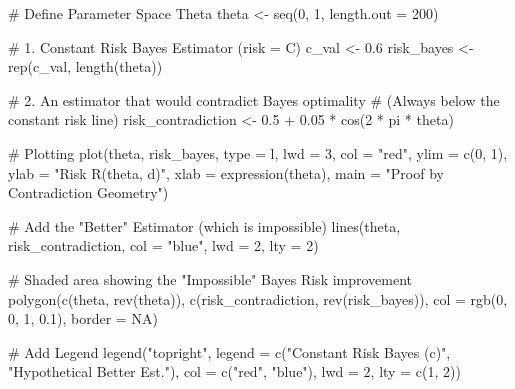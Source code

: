 \documentclass[
  letterpaper,
  DIV=11,
  numbers=noendperiod]{scrreprt}
\newenvironment{Shaded}{\begin{snugshade}}{\end{snugshade}}
\newcommand{\AttributeTok}[1]{\textcolor[rgb]{0.40,0.45,0.13}{#1}}
\newcommand{\CommentTok}[1]{\textcolor[rgb]{0.37,0.37,0.37}{#1}}
\newcommand{\ConstantTok}[1]{\textcolor[rgb]{0.56,0.35,0.01}{#1}}
\newcommand{\DecValTok}[1]{\textcolor[rgb]{0.68,0.00,0.00}{#1}}
\newcommand{\FloatTok}[1]{\textcolor[rgb]{0.68,0.00,0.00}{#1}}
\newcommand{\FunctionTok}[1]{\textcolor[rgb]{0.28,0.35,0.67}{#1}}
\newcommand{\NormalTok}[1]{\textcolor[rgb]{0.00,0.23,0.31}{#1}}
\newcommand{\OtherTok}[1]{\textcolor[rgb]{0.00,0.23,0.31}{#1}}
\newcommand{\SpecialCharTok}[1]{\textcolor[rgb]{0.37,0.37,0.37}{#1}}
\newcommand{\StringTok}[1]{\textcolor[rgb]{0.13,0.47,0.30}{#1}}
\renewcommand{\[}{\begin{equation}}
\renewcommand{\]}{\end{equation}}
\theoremstyle{definition}
\theoremstyle{plain}
\theoremstyle{plain}
\theoremstyle{plain}
\theoremstyle{definition}
\theoremstyle{plain}
\theoremstyle{remark}
\begin{document}
\begin{Shaded}
\begin{Highlighting}[]
\CommentTok{\# Define Parameter Space Theta}
\NormalTok{theta }\OtherTok{\textless{}{-}} \FunctionTok{seq}\NormalTok{(}\DecValTok{0}\NormalTok{, }\DecValTok{1}\NormalTok{, }\AttributeTok{length.out =} \DecValTok{200}\NormalTok{)}

\CommentTok{\# 1. Constant Risk Bayes Estimator (risk = C)}
\NormalTok{c\_val }\OtherTok{\textless{}{-}} \FloatTok{0.6}
\NormalTok{risk\_bayes }\OtherTok{\textless{}{-}} \FunctionTok{rep}\NormalTok{(c\_val, }\FunctionTok{length}\NormalTok{(theta))}

\CommentTok{\# 2. An estimator that would contradict Bayes optimality }
\CommentTok{\# (Always below the constant risk line)}
\NormalTok{risk\_contradiction }\OtherTok{\textless{}{-}} \FloatTok{0.5} \SpecialCharTok{+} \FloatTok{0.05} \SpecialCharTok{*} \FunctionTok{cos}\NormalTok{(}\DecValTok{2} \SpecialCharTok{*}\NormalTok{ pi }\SpecialCharTok{*}\NormalTok{ theta)}

\CommentTok{\# Plotting}
\FunctionTok{plot}\NormalTok{(theta, risk\_bayes, }\AttributeTok{type =} \StringTok{\textquotesingle{}l\textquotesingle{}}\NormalTok{, }\AttributeTok{lwd =} \DecValTok{3}\NormalTok{, }\AttributeTok{col =} \StringTok{"red"}\NormalTok{,}
     \AttributeTok{ylim =} \FunctionTok{c}\NormalTok{(}\DecValTok{0}\NormalTok{, }\DecValTok{1}\NormalTok{), }\AttributeTok{ylab =} \StringTok{"Risk R(theta, d)"}\NormalTok{, }\AttributeTok{xlab =} \FunctionTok{expression}\NormalTok{(theta),}
     \AttributeTok{main =} \StringTok{"Proof by Contradiction Geometry"}\NormalTok{)}

\CommentTok{\# Add the "Better" Estimator (which is impossible)}
\FunctionTok{lines}\NormalTok{(theta, risk\_contradiction, }\AttributeTok{col =} \StringTok{"blue"}\NormalTok{, }\AttributeTok{lwd =} \DecValTok{2}\NormalTok{, }\AttributeTok{lty =} \DecValTok{2}\NormalTok{)}

\CommentTok{\# Shaded area showing the "Impossible" Bayes Risk improvement}
\FunctionTok{polygon}\NormalTok{(}\FunctionTok{c}\NormalTok{(theta, }\FunctionTok{rev}\NormalTok{(theta)), }\FunctionTok{c}\NormalTok{(risk\_contradiction, }\FunctionTok{rev}\NormalTok{(risk\_bayes)), }
        \AttributeTok{col =} \FunctionTok{rgb}\NormalTok{(}\DecValTok{0}\NormalTok{, }\DecValTok{0}\NormalTok{, }\DecValTok{1}\NormalTok{, }\FloatTok{0.1}\NormalTok{), }\AttributeTok{border =} \ConstantTok{NA}\NormalTok{)}

\CommentTok{\# Add Legend}
\FunctionTok{legend}\NormalTok{(}\StringTok{"topright"}\NormalTok{, }
       \AttributeTok{legend =} \FunctionTok{c}\NormalTok{(}\StringTok{"Constant Risk Bayes (c)"}\NormalTok{, }\StringTok{"Hypothetical \textquotesingle{}Better\textquotesingle{} Est."}\NormalTok{),}
       \AttributeTok{col =} \FunctionTok{c}\NormalTok{(}\StringTok{"red"}\NormalTok{, }\StringTok{"blue"}\NormalTok{), }\AttributeTok{lwd =} \DecValTok{2}\NormalTok{, }\AttributeTok{lty =} \FunctionTok{c}\NormalTok{(}\DecValTok{1}\NormalTok{, }\DecValTok{2}\NormalTok{))}
\end{Highlighting}
\end{Shaded}
\end{document}
